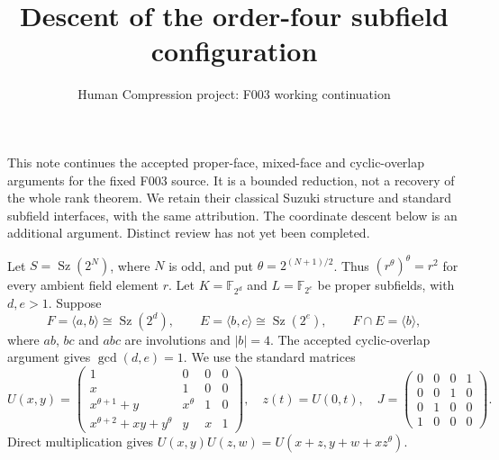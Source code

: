 \documentclass[11pt,a4paper]{article}
\title{Descent of the order-four subfield configuration}
\author{Human Compression project: F003 working continuation}\date{}
\newcommand{\Sz}{\operatorname{Sz}}
\begin{document}
\maketitle
This note continues the accepted proper-face, mixed-face and cyclic-overlap
arguments for the fixed F003 source. It is a bounded reduction, not a
recovery of the whole rank theorem. We retain their classical Suzuki
structure and standard subfield interfaces, with the same attribution.
The coordinate descent below is an additional argument. Distinct review
has not yet been completed.

Let $S=\Sz(2^N)$, where $N$ is odd, and put
$\theta=2^{(N+1)/2}$. Thus $(r^\theta)^\theta=r^2$ for every ambient
field element $r$. Let $K=\mathbb F_{2^d}$ and
$L=\mathbb F_{2^e}$ be proper subfields, with $d,e>1$. Suppose
\[
 F=\langle a,b\rangle\cong\Sz(2^d),\qquad
 E=\langle b,c\rangle\cong\Sz(2^e),\qquad F\cap E=\langle b\rangle,
\]
where $ab$, $bc$ and $abc$ are involutions and $|b|=4$.
The accepted cyclic-overlap argument gives $\gcd(d,e)=1$.
We use the standard matrices
\[
 U(x,y)=\begin{pmatrix}
 1&0&0&0\\x&1&0&0\\x^{\theta+1}+y&x^\theta&1&0\\
 x^{\theta+2}+xy+y^\theta&y&x&1
 \end{pmatrix},\quad z(t)=U(0,t),\quad
 J=\begin{pmatrix}0&0&0&1\\0&0&1&0\\0&1&0&0\\1&0&0&0\end{pmatrix}.
\]
Direct multiplication gives
$U(x,y)U(z,w)=U(x+z,y+w+xz^\theta)$.
\end{document}
